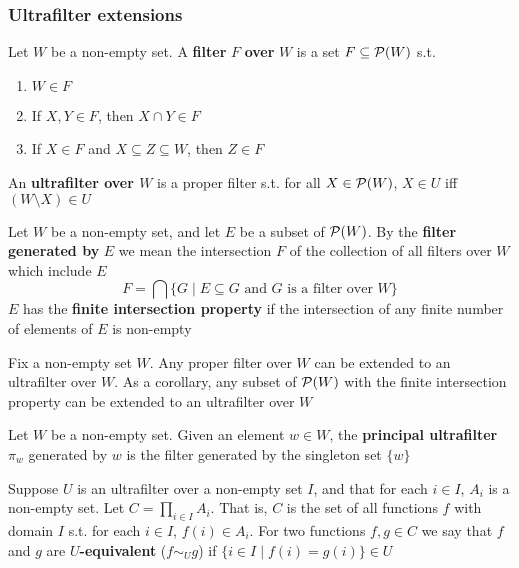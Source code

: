 \documentclass[11pt]{article}
\begin{document}
\subsubsection{Ultrafilter extensions}
\label{sec:orgb9ef6f5}
\begin{definition}
Let \(W\) be a non-empty set. A \textbf{filter} \(F\) \textbf{over} \(W\) is a set
\(F\subseteq\mathcal{P}(W)\) s.t.
\begin{enumerate}
\item \(W\in F\)
\item If \(X,Y\in F\), then \(X\cap Y\in F\)
\item If \(X\in F\) and \(X\subseteq Z\subseteq W\), then \(Z\in F\)
\end{enumerate}


An \textbf{ultrafilter over \(W\)} is a proper filter s.t. for all \(X\in\mathcal{P}(W)\),
\(X\in U\) iff \((W\setminus X)\in U\)
\end{definition}

\begin{definition}[]
Let \(W\) be a non-empty set, and let \(E\) be a subset of \(\mathcal{P}(W)\). By
the \textbf{filter generated by} \(E\) we mean the intersection \(F\) of the
collection of all filters over \(W\) which include \(E\)
\begin{equation*}
F=\bigcap\{G\mid E\subseteq G\text{ and $G$ is a filter over }W\}
\end{equation*}
\(E\) has the \textbf{finite intersection property} if the intersection of any finite
number of elements of \(E\) is non-empty
\end{definition}

\begin{theorem}
Fix a non-empty set \(W\). Any proper filter over \(W\) can be extended to
an ultrafilter over \(W\). As a corollary, any subset of \(\mathcal{P}(W)\) with
the finite intersection property can be extended to an ultrafilter over \(W\)
\end{theorem}

\begin{definition}[]
Let \(W\) be a non-empty set. Given an element \(w\in  W\), the \textbf{principal
ultrafilter} \(\pi_w\) generated by \(w\) is the filter generated by the
singleton set \(\{w\}\)
\end{definition}

Suppose \(U\) is an ultrafilter over a non-empty set \(I\), and that for
each \(i\in I\), \(A_i\) is a non-empty set. Let \(C=\prod_{i\in I}A_i\).
That is, \(C\) is the set of all functions \(f\) with domain \(I\) s.t. for
each \(i\in I\), \(f(i)\in A_i\). For two functions \(f,g\in C\) we say that
\(f\) and \(g\) are \textbf{\(U\)-equivalent} (\(f\sim_U g\)) if \(\{i\in I\mid
    f(i)=g(i)\}\in U\)
\end{document}
